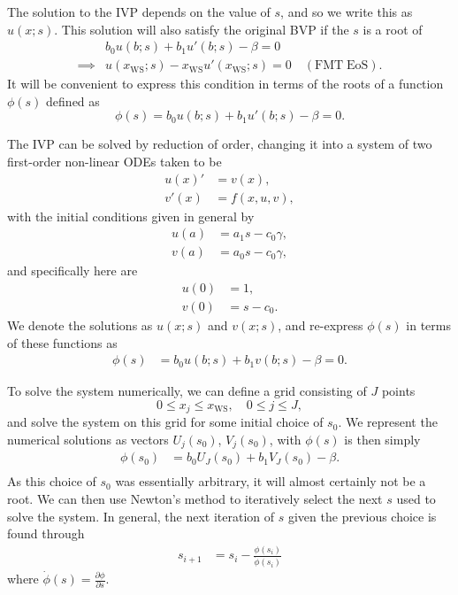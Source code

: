 The solution to the IVP depends on the value of $s$, and so we write this as $u(x;s)$. This solution will also satisfy the original BVP if the $s$ is a root of
\begin{align}
    &b_0 u(b;s) + b_1 u'(b; s) - \beta = 0\\
     \implies &  u(x_\mathrm{WS};s) - x_\mathrm{WS} u'(x_\mathrm{WS};s) = 0\quad\mathrm{(FMT\; EoS)}.
\end{align}
It will be convenient to express this condition in terms of the roots of a function $\phi(s)$ defined as 
\begin{equation}
    \phi(s) = b_0 u(b;s) + b_1 u'(b; s) - \beta = 0.
\end{equation} 

The IVP can be solved by reduction of order, changing it into a system of two first-order non-linear ODEs taken to be 
\begin{align}
    u(x)' & = v(x),\\
    v'(x) & = f(x, u, v),
\end{align}
with the initial conditions given in general by
\begin{align}
    u(a) & = a_1 s - c_0 \gamma, \\
    v(a) & = a_0 s - c_0 \gamma, 
\end{align}
and specifically here are
\begin{align}
    u(0) &= 1,\\
    v(0) & = s - c_0.
\end{align}
We denote the solutions as $u(x;s)$ and $v(x;s)$, and re-express $\phi(s)$ in terms of these functions as
\begin{align}
     \phi(s) & = b_0 u(b;s) + b_1 v(b; s) - \beta = 0.
\end{align}


To solve the system numerically, we can define a grid consisting of $J$ points 
\begin{equation}
    0\leq x_j \leq x_\mathrm{WS},\quad 0\leq j\leq J,
\end{equation}
and solve the system on this grid for some initial choice of $s_0$. We represent the numerical solutions as vectors $U_j(s_0)$,  $V_j(s_0)$, with $\phi(s)$ is then simply
\begin{align}
    \phi(s_0) & = b_0 U_J(s_0) +b_1 V_J(s_0) - \beta.\\
\end{align}
As this choice of $s_0$ was essentially arbitrary, it will almost certainly not be a root. We can then use Newton's method to iteratively select the next $s$ used to solve the system. In general, the next iteration of $s$ given the previous choice is found through
\begin{align}
    s_{i+1} & = s_i - \frac{\phi(s_i)}{\dot{\phi}(s_i)}
\end{align}
where $\dot{\phi}(s) = \frac{\partial\phi}{\partial s}$.

